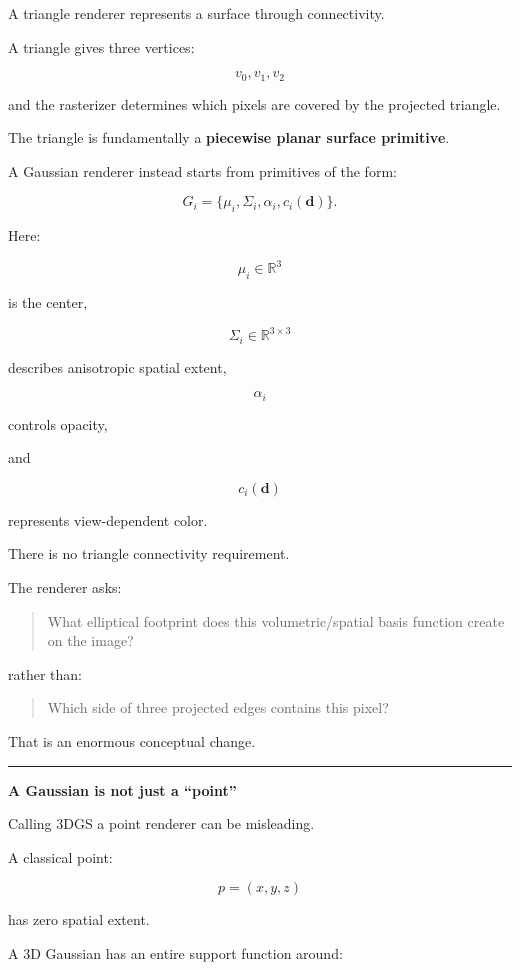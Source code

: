 A triangle renderer represents a surface through connectivity.

A triangle gives three vertices:

\[
v_0,v_1,v_2
\]

and the rasterizer determines which pixels are covered by the projected triangle.

The triangle is fundamentally a \textbf{piecewise planar surface primitive}.

A Gaussian renderer instead starts from primitives of the form:

\[
G_i=
\{
\mu_i,
\Sigma_i,
\alpha_i,
c_i(\mathbf d)
\}.
\]

Here:

\[
\mu_i\in\mathbb R^3
\]

is the center,

\[
\Sigma_i\in\mathbb R^{3\times3}
\]

describes anisotropic spatial extent,

\[
\alpha_i
\]

controls opacity,

and

\[
c_i(\mathbf d)
\]

represents view-dependent color.

There is no triangle connectivity requirement.

The renderer asks:

\begin{quote}
What elliptical footprint does this volumetric/spatial basis function create on the image?
\end{quote}

rather than:

\begin{quote}
Which side of three projected edges contains this pixel?
\end{quote}

That is an enormous conceptual change.

\begin{center}\rule{0.5\linewidth}{0.5pt}\end{center}

\textbf{A Gaussian is not just a ``point''}

Calling 3DGS a point renderer can be misleading.

A classical point:

\[
p=(x,y,z)
\]

has zero spatial extent.

A 3D Gaussian has an entire support function around:

